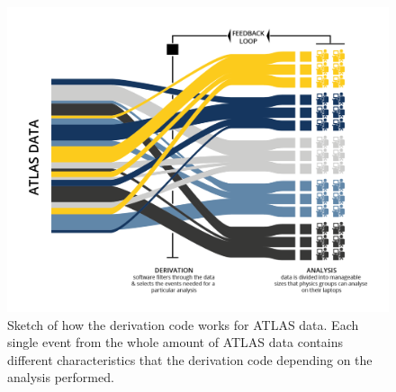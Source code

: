 \begin{figure}[t]
\centering
\includegraphics[width=.45\textwidth]{MCSample/Derivation}
\caption{Sketch of how the derivation code works for ATLAS data. Each single event from the whole amount of ATLAS data contains different characteristics that the derivation code depending on the analysis performed.}
\label{fig:derivation}
\end{figure}















